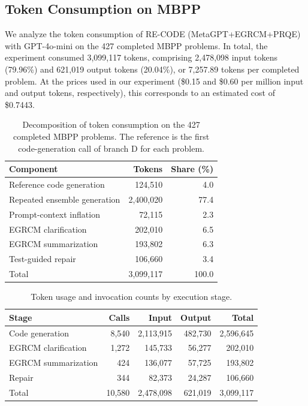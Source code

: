
\subsection{Token Consumption on MBPP}
\label{sec:mbpp-token-consumption}

We analyze the token consumption of RE-CODE (MetaGPT+EGRCM+PRQE) with
GPT-4o-mini on the 427 completed MBPP problems. In total, the experiment
consumed 3,099,117 tokens, comprising 2,478,098 input tokens (79.96\%) and
621,019 output tokens (20.04\%), or 7,257.89 tokens per completed problem.
At the prices used in our experiment (\$0.15 and \$0.60 per million input
and output tokens, respectively), this corresponds to an estimated cost of
\$0.7443.

\begin{table}[t]
  \centering
  \small
  \caption{Decomposition of token consumption on the 427 completed MBPP
  problems. The reference is the first code-generation call of branch D for
  each problem.}
  \label{tab:mbpp-token-decomposition}
  \begin{tabularx}{\linewidth}{@{}Xrr@{}}
    \toprule
    Component & Tokens & Share (\%) \\
    \midrule
    Reference code generation              &   124,510 &  4.0 \\
    Repeated ensemble generation            & 2,400,020 & 77.4 \\
    Prompt-context inflation                 &    72,115 &  2.3 \\
    EGRCM clarification                      &   202,010 &  6.5 \\
    EGRCM summarization                      &   193,802 &  6.3 \\
    Test-guided repair                       &   106,660 &  3.4 \\
    \midrule
    Total                                    & 3,099,117 & 100.0 \\
    \bottomrule
  \end{tabularx}
\end{table}

\begin{table}[t]
  \centering
  \small
  \caption{Token usage and invocation counts by execution stage.}
  \label{tab:mbpp-token-stages}
  \begin{tabular}{@{}lrrrr@{}}
    \toprule
    Stage & Calls & Input & Output & Total \\
    \midrule
    Code generation      & 8,540 & 2,113,915 & 482,730 & 2,596,645 \\
    EGRCM clarification  & 1,272 &   145,733 &  56,277 &   202,010 \\
    EGRCM summarization  &   424 &   136,077 &  57,725 &   193,802 \\
    Repair               &   344 &    82,373 &  24,287 &   106,660 \\
    \midrule
    Total                &10,580 & 2,478,098 & 621,019 & 3,099,117 \\
    \bottomrule
  \end{tabular}
\end{table}

